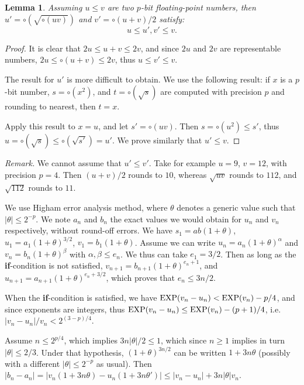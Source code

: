 \documentclass[12pt]{amsart}
\def\Exp{{\rm EXP}}
\newtheorem{lemma}{Lemma}
\begin{document}
\begin{lemma}
Assuming $u \leq v$ are two $p$-bit floating-point numbers,
then $u' = \circ(\sqrt{\circ(uv)})$ and $v' = \circ(u+v)/2$ satisfy:
\[ u \leq u',v' \leq v. \]
\end{lemma}
\begin{proof}
It is clear that $2u \leq u+v \leq 2v$, and since $2u$ and $2v$ are
representable numbers, $2u \leq \circ(u+v) \leq 2v$, thus
$u \leq v' \leq v$.

The result for $u'$ is more difficult to obtain.
We use the following result: if $x$ is a $p$-bit number,
$s = \circ(x^2)$, and $t = \circ(\sqrt{s})$ are computed with precision $p$
and rounding to nearest, then $t = x$.

Apply this result to $x=u$, and let $s' = \circ(u v)$.
Then $s = \circ(u^2) \leq s'$, thus $u = \circ(\sqrt{s}) \leq \circ(\sqrt{s'})
= u'$. We prove similarly that $u' \leq v$.
\end{proof}
\noindent
\textsl{Remark.} We cannot assume that $u' \leq v'$. Take for example
$u = 9$, $v = 12$, with precision $p=4$.
Then $(u+v)/2$ rounds to $10$, whereas $\sqrt{uv}$ rounds to $112$,
and $\sqrt{112}$ rounds to $11$.

\medskip

We use Higham error analysis method, where $\theta$ denotes a generic value
such that $|\theta| \leq 2^{-p}$.
We note $a_n$ and $b_n$ the exact values we would obtain for $u_n$ and $v_n$
respectively, without round-off errors.
We have $s_1 = ab (1+\theta)$, $u_1 = a_1 (1+\theta)^{3/2}$,
$v_1 = b_1 (1+\theta)$.
Assume we can write $u_n = a_n (1+\theta)^{\alpha}$ and
$v_n = b_n(1+\theta)^{\beta}$ with $\alpha, \beta \leq e_n$.
We thus can take $e_1 = 3/2$.
Then as long as the \textbf{if}-condition is not satisfied,
$v_{n+1} = b_{n+1} (1+\theta)^{e_n+1}$,
and $u_{n+1} = a_{n+1} (1+\theta)^{e_n + 3/2}$,
which proves that $e_n \leq 3n/2$.

When the \textbf{if}-condition is satisfied,
we have $\Exp(v_n-u_n) < \Exp(v_n) - p/4$,
and since exponents are integers,
thus $\Exp(v_n-u_n) \leq \Exp(v_n) - (p+1)/4$,
i.e.\ $|v_n-u_n|/v_n < 2^{(3-p)/4}$.

Assume $n \leq 2^{p/4}$, which implies
$3n|\theta|/2 \leq 1$, which since $n \geq 1$ implies in turn $|\theta| \leq
2/3$. Under that hypothesis, $(1+\theta)^{3n/2}$ can be written
$1 + 3n\theta$ (possibly with a different $|\theta| \leq 2^{-p}$ as usual).
Then $|b_n-a_n| = |v_n (1+3n\theta) - u_n (1+3n\theta')|
\leq |v_n-u_n| + 3n |\theta| v_n$.
\end{document}
